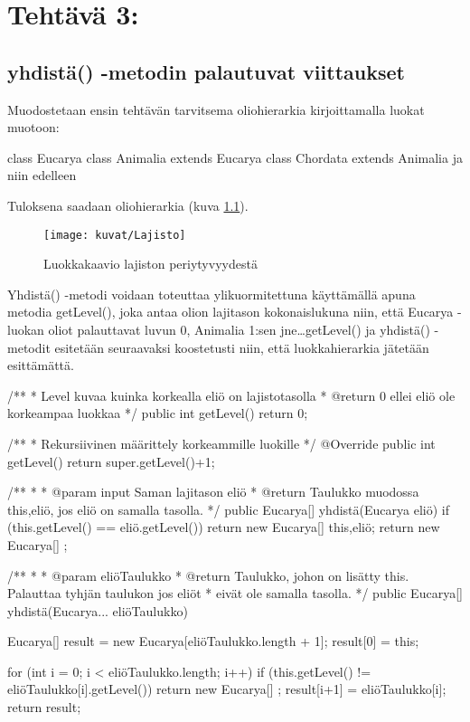 \chapter{Tehtävä 3: 
\label{chap:Teht=0000E4v=0000E4-2}}

\section{yhdistä() -metodin palautuvat viittaukset}

\label{}

Muodostetaan ensin tehtävän tarvitsema oliohierarkia kirjoittamalla luokat
muotoon:

\begin{javacode}
class Eucarya {}
class Animalia extends Eucarya {}
class Chordata extends Animalia {}
ja niin edelleen
\end{javacode}

Tuloksena saadaan oliohierarkia (kuva \ref{Lajisto}). 

\begin{figure}
\centering \texttt{[image: kuvat/Lajisto]}
\caption{Luokkakaavio lajiston periytyvyydestä}
\label{Lajisto} 
\end{figure}

Yhdistä() -metodi voidaan toteuttaa ylikuormitettuna käyttämällä apuna metodia
getLevel(), joka antaa olion lajitason kokonaislukuna niin, että Eucarya -luokan
oliot palauttavat luvun 0, Animalia 1:sen jne\ldots getLevel() ja yhdistä()
-metodit esitetään seuraavaksi koostetusti niin, että luokkahierarkia jätetään
esittämättä.

\begin{javacode}
/**
 * Level kuvaa kuinka korkealla eliö on lajistotasolla
 * @return 0 ellei eliö ole korkeampaa luokkaa
 */
public int getLevel() {
	return 0;
}

/**
 * Rekursiivinen määrittely korkeammille luokille
 */
@Override
public int getLevel() {
	return super.getLevel()+1;
}
	
/**
 * 
 * @param input Saman lajitason eliö
 * @return Taulukko muodossa {this,eliö}, jos eliö on samalla tasolla. 
 */
public Eucarya[] yhdistä(Eucarya eliö) {
	if (this.getLevel() == eliö.getLevel()) {
		return new Eucarya[] {this,eliö};
	}
	return new Eucarya[] {};
}

/**
 * 
 * @param eliöTaulukko
 * @return Taulukko, johon on lisätty this. Palauttaa tyhjän taulukon jos eliöt
 * eivät ole samalla tasolla.
 */
public Eucarya[] yhdistä(Eucarya... eliöTaulukko) {
	Eucarya[] result = new Eucarya[eliöTaulukko.length + 1];
	result[0] = this;
	
	for (int i = 0; i < eliöTaulukko.length; i++) {
		if (this.getLevel() != eliöTaulukko[i].getLevel()) {
			return new Eucarya[] {};
		}
		result[i+1] = eliöTaulukko[i];
	}
	return result;
}
\end{javacode}

